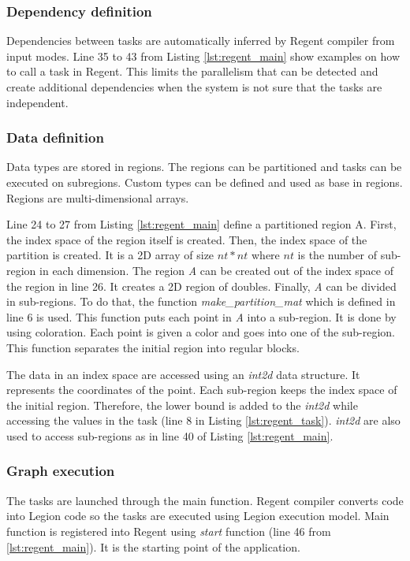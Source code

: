\subsubsection{Dependency definition}
Dependencies between tasks are automatically inferred by Regent compiler from input modes.
Line 35 to 43 from Listing \ref{lst:regent_main} show examples on how to call a task in Regent.
This limits the parallelism that can be detected and create additional dependencies when the system is not sure that the tasks are independent.


\subsubsection{Data definition}
Data types are stored in regions.
The regions can be partitioned and tasks can be executed on subregions.
Custom types can be defined and used as base in regions.
Regions are multi-dimensional arrays.

Line 24 to 27 from Listing \ref{lst:regent_main} define a partitioned region A.
First, the index space of the region itself is created.
Then, the index space of the partition is created.
It is a 2D array of size $nt * nt$ where $nt$ is the number of sub-region in each dimension.
The region \textit{A} can be created out of the index space of the region in line 26.
It creates a 2D region of doubles.
Finally, \textit{A} can be divided in sub-regions.
To do that, the function \textit{make\_partition\_mat} which is defined in line 6 is used.
This function puts each point in \textit{A} into a sub-region.
It is done by using coloration.
Each point is given a color and goes into one of the sub-region.
This function separates the initial region into regular blocks.

The data in an index space are accessed using an \textit{int2d} data structure.
It represents the coordinates of the point.
Each sub-region keeps the index space of the initial region.
Therefore, the lower bound is added to the \textit{int2d} while accessing the values in the task (line 8 in Listing \ref{lst:regent_task}).
\textit{int2d} are also used to access sub-regions as in line 40 of Listing \ref{lst:regent_main}.


\subsubsection{Graph execution}
The tasks are launched through the main function.
Regent compiler converts code into Legion code so the tasks are executed using Legion execution model.
Main function is registered into Regent using \textit{start} function (line 46 from \ref{lst:regent_main}).
It is the starting point of the application.


